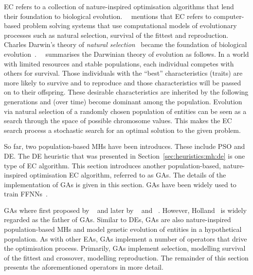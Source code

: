 {\Ac{EC} refers to a collection of nature-inspired optimisation algorithms that lend their foundation to biological evolution.~\citeauthor{ref:engelbrecht:2007}~\cite{ref:engelbrecht:2007} mentions that \acs{EC} refers to computer-based problem solving systems that use computational models of evolutionary processes such as natural selection, survival of the fittest and reproduction. Charles Darwin's theory of \textit{natural selection}~\cite{ref:darwin:2012} became the foundation of biological evolution~\cite{ref:darwin:1987}.~\citeauthor{ref:engelbrecht:2007}~\cite{ref:engelbrecht:2007} summarises the Darwinian theory of evolution as follows. In a world with limited resources and stable populations, each individual competes with others for survival. Those individuals with the ``best'' characteristics (traits) are more likely to survive and to reproduce and those characteristics will be passed on to their offspring. These desirable characteristics are inherited by the following generations and (over time) become dominant among the population. Evolution via natural selection of a randomly chosen population of entities can be seen as a search through the space of possible chromosome values. This makes the \acs{EC} search process a stochastic search for an optimal solution to the given problem.

So far, two population-based \acp{MH} have been introduces. These include \acs{PSO} and \acs{DE}. The \acs{DE} heuristic that was presented in Section~\ref{sec:heuristics:mh:de} is one type of \acs{EC} algorithm. This section introduces another population-based, nature-inspired optimisation \acs{EC} algorithm, referred to as \acfp{GA}. The details of the implementation of \acp{GA} is given in this section. \acp{GA} have been widely used to train \acp{FFNN}~\cite{ref:montana:1989, ref:siddique:2001, ref:miller:1989}.

\Acp{GA} where first proposed by \citeauthor{ref:fraser:1957}~\cite{ref:fraser:1957} and later by \citeauthor{ref:bremermann:1962}~\cite{ref:bremermann:1962} and \citeauthor{ref:reed:1967}~\cite{ref:reed:1967}. However, Holland~\cite{ref:holland:1992} is widely regarded as the father of \acp{GA}. Similar to \acp{DE}, \acp{GA} are also nature-inspired population-based \acp{MH} and model genetic evolution of entities in a hypothetical population. As with other \acp{EA}, \acp{GA} implement a number of operators that drive the optimisation process. Primarily, \acp{GA} implement selection, modelling survival of the fittest and crossover, modelling reproduction. The remainder of this section presents the aforementioned operators in more detail.

}
